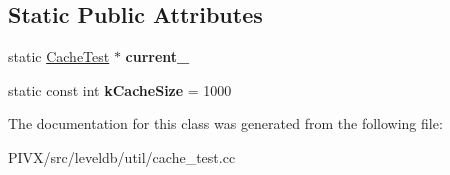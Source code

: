 \subsection*{Static Public Attributes}
\begin{DoxyCompactItemize}
\item 
\mbox{\label{classleveldb_1_1_cache_test_a91ef57f644d0531b882caed9547759f6}} 
static \mbox{\hyperlink{classleveldb_1_1_cache_test}{Cache\+Test}} $\ast$ {\bfseries current\+\_\+}
\item 
\mbox{\label{classleveldb_1_1_cache_test_a101eeca736aed0fde7048d0bf21b7e0a}} 
static const int {\bfseries k\+Cache\+Size} = 1000
\end{DoxyCompactItemize}


The documentation for this class was generated from the following file\+:\begin{DoxyCompactItemize}
\item 
P\+I\+V\+X/src/leveldb/util/cache\+\_\+test.\+cc\end{DoxyCompactItemize}
